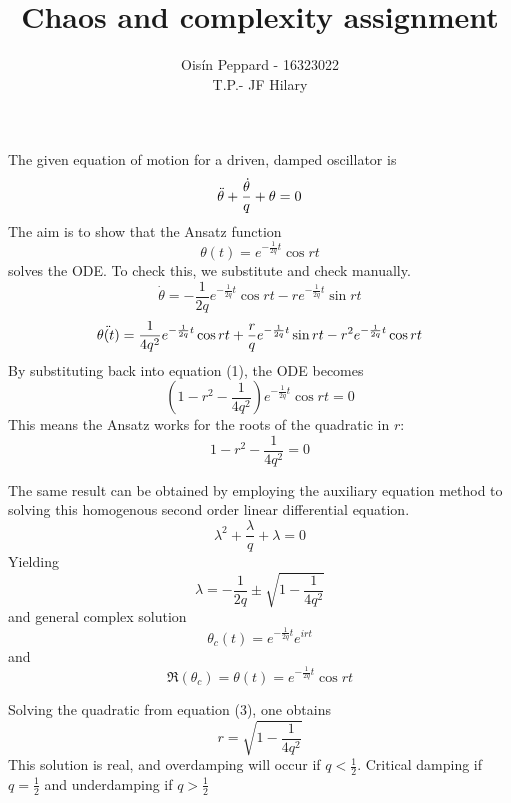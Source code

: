\documentclass[12pt]{article}
\newenvironment{problem}[2][Problem]{\begin{trivlist}
\item[\hskip \labelsep {\bfseries #1}\hskip \labelsep {\bfseries #2.}]}{\end{trivlist}}
\begin{document}
 
 
\title{Chaos and complexity assignment}%
\author{Oisín Peppard - 16323022\\ %
T.P.- JF Hilary} %
 
\maketitle

\begin{problem}{1}
The given equation of motion for a driven, damped oscillator is 
\begin{equation}
    \Ddot{\theta} + \frac{\dot{\theta}}{q} + \theta = 0
\end{equation}
The aim is to show that the Ansatz function 
\begin{equation}
    \theta(t) = e^{-\frac{1}{2q}t}\cos{rt}
\end{equation}
solves the ODE. To check this, we substitute and check manually.
\[\dot{\theta} = -\frac{1}{2q}e^{-\frac{1}{2q}t}\cos{rt} - re^{-\frac{1}{2q}t}\sin{rt}\]
\[\Ddot{\theta(t)} = \frac{1}{4q^2}e^{-\frac{1}{2q}t}\cos{rt} + \frac{r}{q}e^{-\frac{1}{2q}t}\sin{rt} - r^2e^{-\frac{1}{2q}t}\cos{rt}\]
By substituting back into equation (1), the ODE becomes 
\begin{equation}
    (1-r^2-\frac{1}{4q^2})e^{-\frac{1}{2q}t}\cos{rt} = 0
\end{equation}
This means the Ansatz works for the roots of the quadratic in $r$:
\[ 1-r^2-\frac{1}{4q^2} = 0\]

The same result can be obtained by employing the auxiliary equation method to solving this homogenous second order linear differential equation.
\[\lambda^2 + \frac{\lambda}{q} + \lambda = 0\]
Yielding 
\[\lambda = -\frac{1}{2q} \pm \sqrt{1-\frac{1}{4q^2}}\] 
and general complex solution 
\[\theta_c(t) = e^{-\frac{1}{2q}t}e^{irt}\]
and \[\Re(\theta_c) = \theta(t) = e^{-\frac{1}{2q}t}\cos{rt}\] 

\end{problem}

\begin{problem}{2}
Solving the quadratic from equation (3), one obtains
\[ r = \sqrt{1-\frac{1}{4q^2}}\]
This solution is real, and overdamping will occur if $q < \frac{1}{2}$. Critical damping if $q = \frac{1}{2}$ and underdamping if $q > \frac{1}{2}$
\end{problem}
\end{document}
